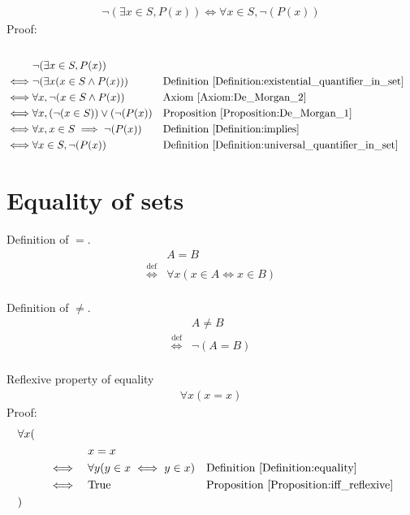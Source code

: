 \begin{prop}
\begin{align*}
\lnot (\exists x \in S, P(x)) \iff \forall x \in S, \lnot (P(x))
\end{align*}
Proof: \\ \\
\begin{align*}
& \lnot (\exists x \in S, P(x)) \\
\iff & \lnot ( \exists x (x \in S \land P(x)) )
&& \text{Definition \ref{Definition:existential_quantifier_in_set}} \\
\iff & \forall x, \lnot (x \in S \land P(x))
&& \text{Axiom \ref{Axiom:De_Morgan_2}} \\
\iff & \forall x, (\lnot(x \in S)) \lor (\lnot (P(x))
&& \text{Proposition \ref{Proposition:De_Morgan_1}} \\
\iff & \forall x, x \in S \implies \lnot (P(x))
&& \text{Definition \ref{Definition:implies}} \\
\iff & \forall x \in S, \lnot (P(x))
&& \text{Definition \ref{Definition:universal_quantifier_in_set}} \\
\end{align*}
\end{prop}

\section{Equality of sets}
\begin{defn}
\label{Definition:equality}
Definition of $=$.
\begin{align*}
& A = B \\
\overset{\operatorname{def}}{\iff} & \forall x (x \in A \iff x \in B) \\
\end{align*}
\end{defn}

\begin{defn}
\label{Definition:neq}
Definition of $\neq$.
\begin{align*}
& A \neq B \\
\overset{\operatorname{def}}{\iff} & \lnot (A = B) \\
\end{align*}
\end{defn}

\begin{prop}
Reflexive property of equality
\begin{align*}
\forall x (x = x)
\end{align*}
Proof:
\begin{align*}
& \forall x ( \\
& \quad &&  && x = x \\
& \quad && \iff && \forall y (y \in x \iff y \in x)
&& \text{Definition \ref{Definition:equality}} \\
& \quad && \iff && \text{True}
&& \text{Proposition \ref{Proposition:iff_reflexive}} \\
& )
\end{align*}
\end{prop}

